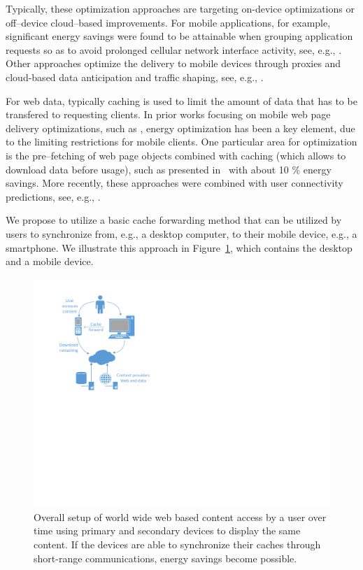 \documentclass[letterpaper,conference]{IEEEtran}
\begin{document}
Typically, these optimization approaches are targeting on-device optimizations or off--device cloud--based improvements.
For mobile applications, for example, significant energy savings were found to be attainable when grouping application requests so as to avoid prolonged cellular network interface activity, see, e.g., \cite{BaBaVe09,QiWaGaHuGe12}.
Other approaches optimize the delivery to mobile devices through proxies and cloud-based data anticipation and traffic shaping, see, e.g., \cite{XiHuSaYl11}.

For web data, typically caching is used to limit the amount of data that has to be transfered to requesting clients.
In prior works focusing on mobile web page delivery optimizations, such as \cite{SaIs02}, energy optimization has been a key element, due to the limiting restrictions for mobile clients.
One particular area for optimization is the pre--fetching of web page objects combined with caching (which allows to download data before usage), such as presented in~\cite{ShKuDaWa05} with about 10 \% energy savings.
More recently, these approaches were combined with user connectivity predictions, see, e.g., \cite{ThChWo13}.

We propose to utilize a basic cache forwarding method that can be utilized by users to synchronize from, e.g., a desktop computer, to their mobile device, e.g., a smartphone.
We illustrate this approach in Figure~\ref{fig:setup}, which contains the desktop and a mobile device. 
\begin{figure}
	\centering
	\includegraphics[width=.9\linewidth]{Drawing1}
	\caption{Overall setup of world wide web based content access by a user over time using primary and secondary devices to display the same content. If the devices are able to synchronize their caches through short-range communications, energy savings become possible.}
	\label{fig:setup}
\end{figure}
\end{document}
